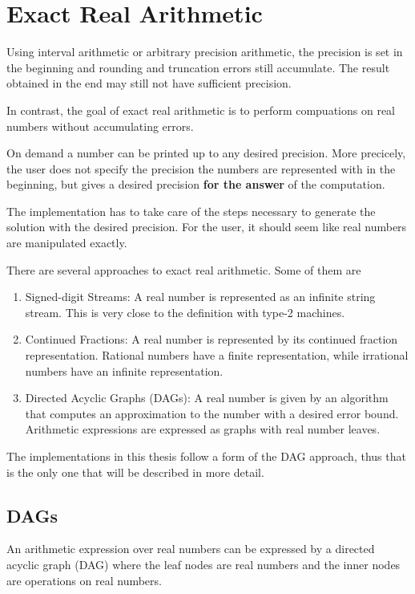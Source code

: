 \section{Exact Real Arithmetic}\label{sec:exact real arithmetic}
	Using interval arithmetic or arbitrary precision arithmetic, 
	the precision is set in the beginning and rounding and truncation errors still accumulate.
	The result obtained in the end may still not have sufficient precision.

	In contrast, the goal of exact real arithmetic is to perform compuations on real numbers without 
	accumulating errors.
  
  On demand a number can be printed up to any desired precision. 
	More precicely, the user does not specify the precision the numbers are represented with in the beginning,
	but gives a desired precision \textbf{for the answer} of the computation.
  
  The implementation has to take care of the steps necessary to generate the
  solution with the desired precision.
  For the user, it should seem like real numbers are manipulated exactly.

	There are several approaches to exact real arithmetic.
	Some of them are
  \begin{enumerate}
     \item Signed-digit Streams: A real number is represented as an infinite
       string stream. This is very close to the definition with type-2
       machines.
     \item Continued Fractions: A real number is represented by its continued
       fraction representation. Rational numbers have a finite representation,
       while irrational numbers have an infinite representation.
     \item Directed Acyclic Graphs (DAGs): A real number is given by an
       algorithm that computes an approximation to the number with a desired
       error bound. Arithmetic expressions are expressed as graphs with real
       number leaves.
  \end{enumerate}
  The implementations in this thesis follow a form of the DAG approach, thus
  that is the only one that will be described in more detail.
	\subsection{DAGs}
		An arithmetic expression over real numbers can be expressed by a directed acyclic graph (DAG)
		where the leaf nodes are real numbers and the inner nodes are operations on real numbers.
		
